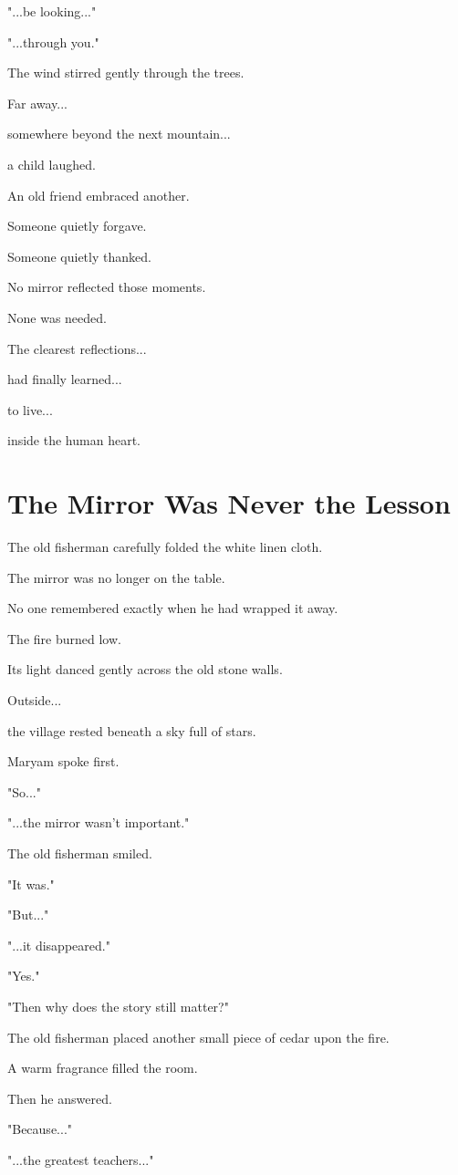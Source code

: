 \documentclass[12pt,openany]{book}
\begin{document}
"...be looking..."

"...through you."

The wind stirred gently through the trees.

Far away...

somewhere beyond the next mountain...

a child laughed.

An old friend embraced another.

Someone quietly forgave.

Someone quietly thanked.

No mirror reflected those moments.

None was needed.

The clearest reflections...

had finally learned...

to live...

inside the human heart.
\section*{The Mirror Was Never the Lesson}

The old fisherman carefully folded the white linen cloth.

The mirror was no longer on the table.

No one remembered exactly when he had wrapped it away.

The fire burned low.

Its light danced gently across the old stone walls.

Outside...

the village rested beneath a sky full of stars.

Maryam spoke first.

"So..."

"...the mirror wasn't important."

The old fisherman smiled.

"It was."

"But..."

"...it disappeared."

"Yes."

"Then why does the story still matter?"

The old fisherman placed another small piece of cedar upon the fire.

A warm fragrance filled the room.

Then he answered.

"Because..."

"...the greatest teachers..."
\end{document}
